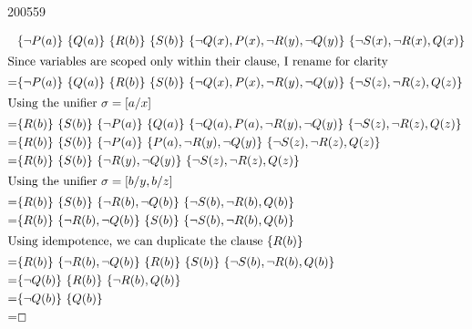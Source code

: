 \documentclass[10pt,\jkfside,a4paper]{article}
\begin{document}
\begin{examquestion}{2005}{5}{9}
\begin{enumerate}
\begin{align*}
 & \{\neg P(a)\}\ \{Q(a)\}\ \{R(b)\}\ \{S(b)\}\ \{\neg Q(x), P(x), \neg R(y),
\neg Q(y)\}\ \{\neg S(x), \neg R(x), Q(x)\} \\
\intertext{Since variables are scoped only within their clause, I rename for
 clarity}
=& \{\neg P(a)\}\ \{Q(a)\}\ \{R(b)\}\ \{S(b)\}\ \{\neg Q(x), P(x), \neg R(y),
\neg Q(y)\}\ \{\neg S(z), \neg R(z), Q(z)\} \\
\intertext{Using the unifier $\sigma = [a/x]$}
=& \{R(b)\}\ \{S(b)\}\ \{\neg P(a)\}\ \{Q(a)\}\ \{\neg Q(a), P(a), \neg R(y),
\neg Q(y)\}\ \{\neg S(z), \neg R(z), Q(z)\} \\
=& \{R(b)\}\ \{S(b)\}\ \{\neg P(a)\}\ \{P(a), \neg R(y),
\neg Q(y)\}\ \{\neg S(z), \neg R(z), Q(z)\} \\
=& \{R(b)\}\ \{S(b)\}\ \{\neg R(y), \neg Q(y)\}\ \{\neg S(z), \neg R(z), Q
(z)\} \\
\intertext{Using the unifier $\sigma = [b/y, b/z]$}
=& \{R(b)\}\ \{S(b)\}\ \{\neg R(b), \neg Q(b)\}\ \{\neg S(b), \neg R(b), Q
(b)\} \\
=& \{R(b)\}\ \{\neg R(b), \neg Q(b)\}\ \{S(b)\}\ \{\neg S(b), \neg R(b), Q
(b)\} \\
\intertext{Using idempotence, we can duplicate the clause $\{R(b)\}$}
=& \{R(b)\}\ \{\neg R(b), \neg Q(b)\}\ \{R(b)\}\ \{S(b)\}\ \{\neg S(b), \neg
 R(b), Q(b)\} \\
=& \{\neg Q(b)\}\ \{R(b)\}\ \{\neg R(b), Q(b)\} \\
=& \{\neg Q(b)\}\ \{Q(b)\} \\
=& \boxempty
\end{align*}

\end{enumerate}

\end{examquestion}
\end{document}
